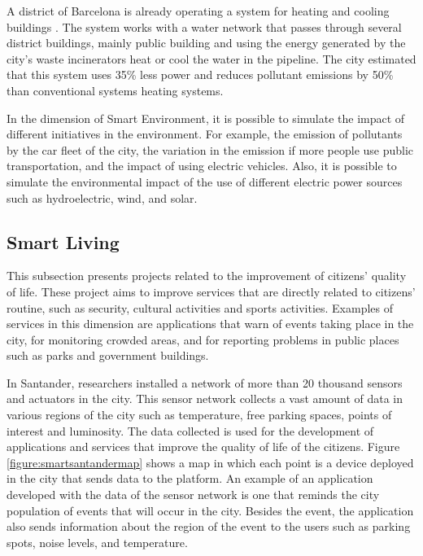 A district of Barcelona is already operating a system for heating and cooling buildings \cite{hug2016barcelona}. The system works with a water network that passes through several district buildings, mainly public building and using the energy generated by the city's waste incinerators heat or cool the water in the pipeline. The city estimated that this system uses 35\% less power and reduces pollutant emissions by 50\% than conventional systems heating systems.

In the dimension of Smart Environment, it is possible to simulate the impact of different initiatives in the environment. For example, the emission of pollutants by the car fleet of the city, the variation in the emission if more people use public transportation, and the impact of using electric vehicles. Also, it is possible to simulate the environmental impact of the use of different electric power sources such as hydroelectric, wind, and solar. 

\subsection{Smart Living}

This subsection presents projects related to the improvement of citizens' quality of life. These project aims to improve services that are directly related to citizens' routine, such as security, cultural activities and sports activities. Examples of services in this dimension are applications that warn of events taking place in the city, for monitoring crowded areas, and for reporting problems in public places such as parks and government buildings.

In Santander, researchers installed a network of more than 20 thousand sensors and actuators in the city. This sensor network collects a vast amount of data in various regions of the city such as temperature, free parking spaces, points of interest and luminosity. The data collected is used for the development of applications and services that improve the quality of life of the citizens. Figure \ref{figure:smartsantandermap} shows a map in which each point is a device deployed in the city that sends data to the platform. An example of an application developed with the data of the sensor network is one that reminds the city population of events that will occur in the city. Besides the event, the application also sends information about the region of the event to the users such as parking spots, noise levels, and temperature.


